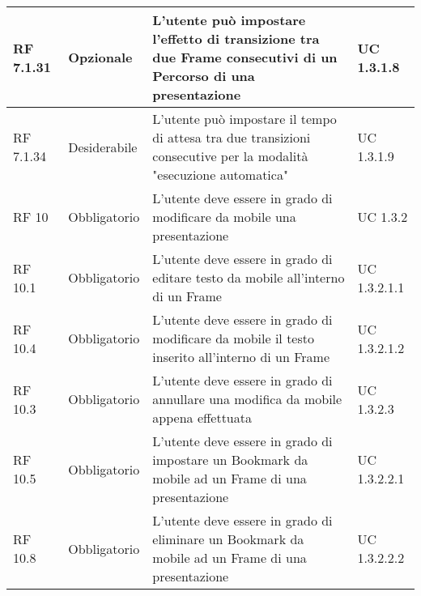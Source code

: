 {\begin{longtable} [c]{| p{2.5cm} | p{2.5cm} | p{6cm} |p{2.5cm}|}
			\hline
			RF 7.1.31 & Opzionale & L'utente può impostare l’effetto di transizione tra due Frame\ped{g} consecutivi di un Percorso\ped{g} di una presentazione & UC 1.3.1.8\\
			\hline
			RF 7.1.34 & Desiderabile & L'utente può impostare il tempo di attesa tra due transizioni consecutive per la modalità "esecuzione automatica" & UC 1.3.1.9\\
			\hline
			RF 10 & Obbligatorio & L'utente deve essere in grado di modificare da mobile una presentazione & UC 1.3.2\\
			\hline
			RF 10.1 & Obbligatorio & L'utente deve essere in grado di editare testo da mobile all'interno di un Frame\ped{g} & UC 1.3.2.1.1\\
			\hline
			RF 10.4 & Obbligatorio & L'utente deve essere in grado di modificare da mobile il testo inserito all'interno di un Frame\ped{g} & UC 1.3.2.1.2\\
			\hline
			RF 10.3 & Obbligatorio & L'utente deve essere in grado di annullare una modifica da mobile appena effettuata & UC 1.3.2.3\\
			\hline
			RF 10.5 & Obbligatorio & L'utente deve essere in grado di impostare un Bookmark\ped{g} da mobile ad un Frame\ped{g} di una presentazione & UC 1.3.2.2.1\\
			\hline
			RF 10.8 & Obbligatorio & L'utente deve essere in grado di eliminare un Bookmark\ped{g} da mobile ad un Frame\ped{g} di una presentazione & UC 1.3.2.2.2\\
			

\end{longtable}}
